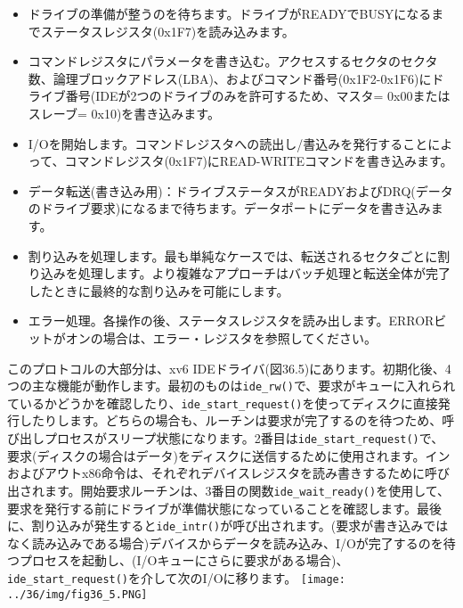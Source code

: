 \begin{itemize}
\tightlist
\item
  ドライブの準備が整うのを待ちます。ドライブがREADYでBUSYになるまでステータスレジスタ(0x1F7)を読み込みます。\\
\item
  コマンドレジスタにパラメータを書き込む。アクセスするセクタのセクタ数、論理ブロックアドレス(LBA)、およびコマンド番号(0x1F2-0x1F6)にドライブ番号(IDEが2つのドライブのみを許可するため、マスタ=
  0x00またはスレーブ= 0x10)を書き込みます。\\
\item
  I/Oを開始します。コマンドレジスタへの読出し/書込みを発行することによって、コマンドレジスタ(0x1F7)にREAD-WRITEコマンドを書き込みます。\\
\item
  データ転送(書き込み用)：ドライブステータスがREADYおよびDRQ(データのドライブ要求)になるまで待ちます。データポートにデータを書き込みます。\\
\item
  割り込みを処理します。最も単純なケースでは、転送されるセクタごとに割り込みを処理します。より複雑なアプローチはバッチ処理と転送全体が完了したときに最終的な割り込みを可能にします。\\
\item
  エラー処理。各操作の後、ステータスレジスタを読み出します。ERRORビットがオンの場合は、エラー・レジスタを参照してください。
\end{itemize}

このプロトコルの大部分は、xv6
IDEドライバ(図36.5)にあります。初期化後、4つの主な機能が動作します。最初のものは\texttt{ide\_rw()}で、要求がキューに入れられているかどうかを確認したり、\texttt{ide\_start\_request()}を使ってディスクに直接発行したりします。どちらの場合も、ルーチンは要求が完了するのを待つため、呼び出しプロセスがスリープ状態になります。2番目は\texttt{ide\_start\_request()}で、要求(ディスクの場合はデータ)をディスクに送信するために使用されます。インおよびアウトx86命令は、それぞれデバイスレジスタを読み書きするために呼び出されます。開始要求ルーチンは、3番目の関数\texttt{ide\_wait\_ready()}を使用して、要求を発行する前にドライブが準備状態になっていることを確認します。最後に、割り込みが発生すると\texttt{ide\_intr()}が呼び出されます。(要求が書き込みではなく読み込みである場合)デバイスからデータを読み込み、I/Oが完了するのを待つプロセスを起動し、(I/Oキューにさらに要求がある場合)、\texttt{ide\_start\_request()}を介して次のI/Oに移ります。
\texttt{[image: ../36/img/fig36\_5.PNG]}

